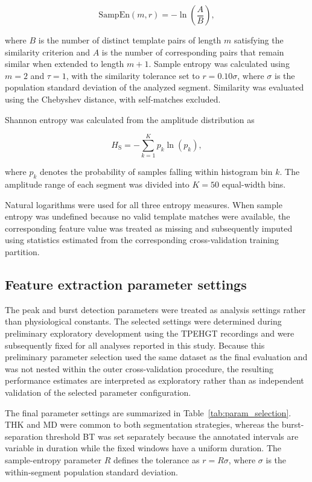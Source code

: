 \documentclass[10pt,letterpaper]{article}
\begin{document}
\begin{equation}
\mathrm{SampEn}(m,r)
=
-\ln\left(\frac{A}{B}\right),
\end{equation}

where $B$ is the number of distinct template pairs of length $m$ satisfying the similarity criterion and $A$ is the number of corresponding pairs that remain similar when extended to length $m+1$. Sample entropy was calculated using $m=2$ and $\tau=1$, with the similarity tolerance set to $r=0.10\sigma$, where $\sigma$ is the population standard deviation of the analyzed segment. Similarity was evaluated using the Chebyshev distance, with self-matches excluded.

Shannon entropy was calculated from the amplitude distribution as

\begin{equation}
H_{\mathrm{S}}
=
-\sum_{k=1}^{K} p_k \ln(p_k),
\end{equation}

where $p_k$ denotes the probability of samples falling within histogram bin $k$. The amplitude range of each segment was divided into $K=50$ equal-width bins.

Natural logarithms were used for all three entropy measures. When sample entropy was undefined because no valid template matches were available, the corresponding feature value was treated as missing and subsequently imputed using statistics estimated from the corresponding cross-validation training partition.

\subsection*{Feature extraction parameter settings}

The peak and burst detection parameters were treated as analysis settings rather than physiological constants. The selected settings were determined during preliminary exploratory development using the TPEHGT recordings and were subsequently fixed for all analyses reported in this study. Because this preliminary parameter selection used the same dataset as the final evaluation and was not nested within the outer cross-validation procedure, the resulting performance estimates are interpreted as exploratory rather than as independent validation of the selected parameter configuration.

The final parameter settings are summarized in Table~\ref{tab:param_selection}. THK and MD were common to both segmentation strategies, whereas the burst-separation threshold BT was set separately because the annotated intervals are variable in duration while the fixed windows have a uniform duration. The sample-entropy parameter $R$ defines the tolerance as $r=R\sigma$, where $\sigma$ is the within-segment population standard deviation.
\end{document}
